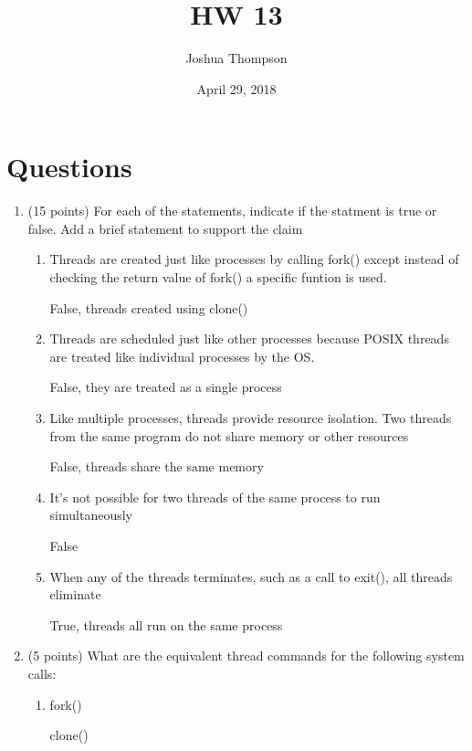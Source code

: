\documentclass{article}[9pt]
\title{HW 13}
\author{Joshua Thompson}
\date{April 29, 2018}
\newenvironment{answerfont}{\fontfamily{qhv}\selectfont}{\par}
\newenvironment{myanswer}{\begin{mdframed}\begin{answerfont}}{\end{answerfont}\end{mdframed}}
\begin{document}
\maketitle
\section*{Questions}
\label{sec:org3ac93b9}

\begin{enumerate}

\item (15 points) For each of the statements, indicate if the statment is true or false. Add a brief statement to support the claim
\begin{enumerate}
  \item Threads are created just like processes by calling fork() except instead of checking the return value of fork() a specific funtion is used.
  \begin{myanswer}
  False, threads created using clone()
  \end{myanswer}

  \item Threads are scheduled just like other processes because POSIX threads are treated like individual processes by the OS.
  \begin{myanswer}
  False, they are treated as a single process
  \end{myanswer}

  \item Like multiple processes, threads provide resource isolation. Two threads from the same program do not share memory or other resources
  \begin{myanswer}
  False, threads share the same memory
  \end{myanswer}

  \item It's not possible for two threads of the same process to run simultaneously
  \begin{myanswer}
  False
  \end{myanswer}

  \item When any of the threads terminates, such as a call to exit(), all threads eliminate
  \begin{myanswer}
  True, threads all run on the same process
  \end{myanswer}
\end{enumerate}

\item (5 points) What are the equivalent thread commands for the following system calls:
\begin {enumerate}
  \item fork()
  \begin{myanswer}
  clone()
  \end{myanswer}


\end{enumerate}
\end{enumerate}
\end{document}
